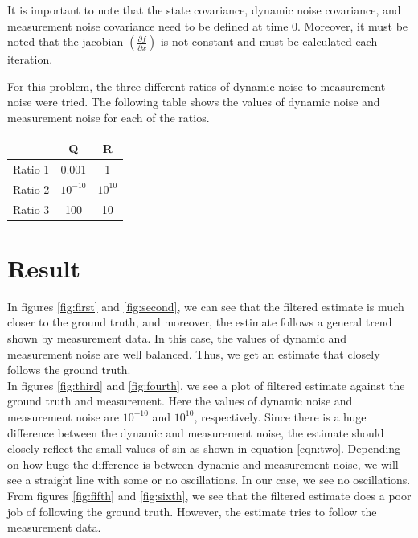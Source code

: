 \documentclass{article}
\begin{document}
It is important to note that the state covariance, dynamic noise covariance, and measurement noise covariance need to be defined at time 0. Moreover, it must be noted that the jacobian $\left(\frac{\partial f}{\partial x}\right)$ is not constant and must be calculated each iteration.

For this problem, the three different ratios of dynamic noise to measurement noise were tried. The following table shows the values of dynamic noise and measurement noise for each of the ratios.
\begin{center}
\begin{tabular}{| c | c | c |} 
 \hline
  & Q & R \\ [0.5ex] 
 \hline\hline
 Ratio 1 & 0.001 & 1  \\ [0.5ex]
 Ratio 2 & $10^{-10}$ & $ 10^{10}$ \\[0.5ex]
 Ratio 3 & 100 & 10 \\[0.5ex]
 \hline
\end{tabular}
\end{center}

\section{Result}\label{sec:code}

\indent

In figures \ref{fig:first} and \ref{fig:second}, we can see that the filtered estimate is much closer to the ground truth, and moreover, the estimate follows a general trend shown by measurement data. In this case, the values of dynamic and measurement noise are well balanced. Thus, we get an estimate that closely follows the ground truth.\\
\indent
In figures \ref{fig:third} and \ref{fig:fourth}, we see a plot of filtered estimate against the ground truth and measurement. Here the values of dynamic noise and measurement noise are  $10^{-10}$ and $10^{10}$, respectively. Since there is a huge difference between the dynamic and measurement noise, the estimate should closely reflect the small values of sin as shown in equation \ref{eqn:two}. Depending on how huge the difference is between dynamic and measurement noise, we will see a straight line with some or no oscillations. In our case, we see no oscillations.\\
\indent
From figures \ref{fig:fifth} and \ref{fig:sixth}, we see that the filtered estimate does a poor job of following the ground truth. However, the estimate tries to follow the measurement data.
\end{document}
